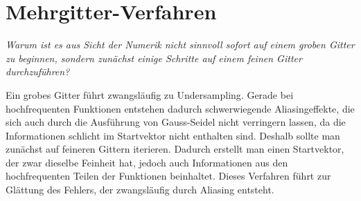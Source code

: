 \documentclass[paper = a4]{scrartcl}
\begin{document}

\section{Mehrgitter-Verfahren}

\emph{Warum ist es aus Sicht der Numerik nicht sinnvoll sofort auf einem groben Gitter zu beginnen, sondern zunächst einige Schritte auf einem feinen Gitter durchzuführen?}

Ein grobes Gitter führt zwangsläufig zu Undersampling. Gerade bei hochfrequenten Funktionen entstehen dadurch schwerwiegende Aliasingeffekte, die sich auch durch die Ausführung von Gauss-Seidel nicht verringern lassen, da die Informationen schlicht im Startvektor nicht enthalten sind. Deshalb sollte man zunächst auf feineren Gittern iterieren. Dadurch erstellt man einen Startvektor, der zwar dieselbe Feinheit hat, jedoch auch Informationen aus den hochfrequenten Teilen der Funktionen beinhaltet. Dieses Verfahren führt zur Glättung des Fehlers, der zwangsläufig durch Aliasing entsteht.
\end{document}
